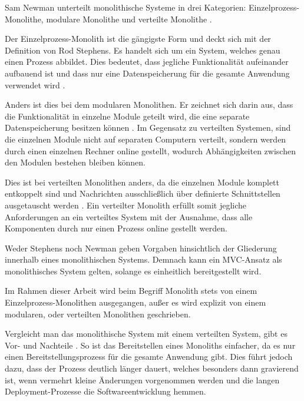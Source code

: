 Sam Newman unterteilt monolithische Systeme in drei Kategorien: Einzelprozess-Monolithe, modulare Monolithe und verteilte Monolithe \parencite[vgl.][Kap. 2.2]{newman_monolith_2019}.

Der Einzelprozess-Monolith ist die gängigste Form und deckt sich mit der Definition von Rod Stephens. Es handelt sich um ein System, welches genau einen Prozess abbildet. Dies bedeutet, dass jegliche Funktionalität aufeinander aufbauend ist und dass nur eine Datenspeicherung für die gesamte Anwendung verwendet wird \parencite[vgl.][Kap. 2.2.1]{newman_monolith_2019}.

Anders ist dies bei dem modularen Monolithen. Er zeichnet sich darin aus, dass die Funktionalität in einzelne Module geteilt wird, die eine separate Datenspeicherung besitzen können \parencite[vgl.][Kap. 2.2.2]{newman_monolith_2019}. Im Gegensatz zu verteilten Systemen, sind die einzelnen Module nicht auf separaten Computern verteilt, sondern werden durch einen einzelnen Rechner online gestellt, wodurch Abhängigkeiten zwischen den Modulen bestehen bleiben können.

Dies ist bei verteilten Monolithen anders, da die einzelnen Module komplett entkoppelt sind und Nachrichten ausschließlich über definierte Schnittstellen ausgetauscht werden \parencite[vgl.][S. 116]{starke_effektive_2015}. Ein verteilter Monolith erfüllt somit jegliche Anforderungen an ein verteiltes System mit der Ausnahme, dass alle Komponenten durch nur einen Prozess online gestellt werden.

Weder Stephens noch Newman geben Vorgaben hinsichtlich der Gliederung innerhalb eines monolithischen Systems. Demnach kann ein MVC-Ansatz als monolithisches System gelten, solange es einheitlich bereitgestellt wird.

Im Rahmen dieser Arbeit wird beim Begriff Monolith stets von einem Einzelprozess-Monolithen ausgegangen, außer es wird explizit von einem modularen, oder verteilten Monolithen geschrieben.

Vergleicht man das monolithische System mit einem verteilten System, gibt es Vor- und Nachteile \parencite[vgl.][Kap. 2.2.4 und Kap. 2.2.5]{newman_monolith_2019}. So ist das Bereitstellen eines Monoliths einfacher, da es nur einen Bereitstellungsprozess für die gesamte Anwendung gibt. Dies führt jedoch dazu, dass der Prozess deutlich länger dauert, welches besonders dann gravierend ist, wenn vermehrt kleine Änderungen vorgenommen werden und die langen Deployment-Prozesse die Softwareentwicklung hemmen. 

